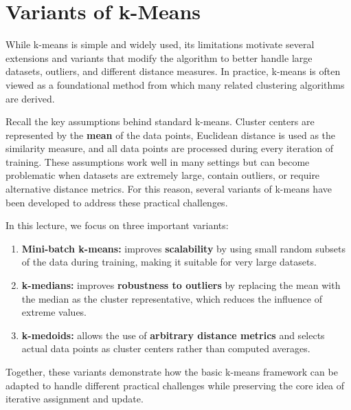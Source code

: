 \documentclass{article}
\begin{document}

\section{Variants of k-Means}

While k-means is simple and widely used, its limitations motivate several
extensions and variants that modify the algorithm to better handle large
datasets, outliers, and different distance measures. In practice, k-means is
often viewed as a foundational method from which many related clustering
algorithms are derived.

Recall the key assumptions behind standard k-means. Cluster centers are
represented by the \textbf{mean} of the data points, Euclidean distance is used
as the similarity measure, and all data points are processed during every
iteration of training. These assumptions work well in many settings but can
become problematic when datasets are extremely large, contain outliers, or
require alternative distance metrics. For this reason, several variants of
k-means have been developed to address these practical challenges.

In this lecture, we focus on three important variants:

\begin{enumerate}
\item \textbf{Mini-batch k-means:} improves \textbf{scalability} by using small
random subsets of the data during training, making it suitable for very large
datasets.

\item \textbf{k-medians:} improves \textbf{robustness to outliers} by replacing
the mean with the median as the cluster representative, which reduces the
influence of extreme values.

\item \textbf{k-medoids:} allows the use of \textbf{arbitrary distance metrics}
and selects actual data points as cluster centers rather than computed averages.
\end{enumerate}

Together, these variants demonstrate how the basic k-means framework can be
adapted to handle different practical challenges while preserving the core idea
of iterative assignment and update.
\end{document}
